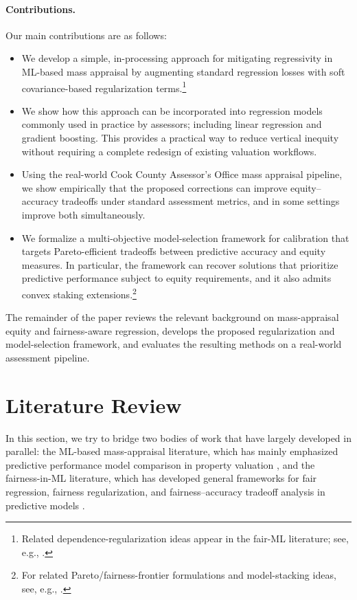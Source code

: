 \documentclass[12pt, draft]{article}
\theoremstyle{plain}
\theoremstyle{definition}
\newcommand{\1}{\mathbf{1}}
\begin{document}
\paragraph{Contributions.} Our main contributions are as follows:
\begin{itemize}
    \item We develop a simple, in-processing approach for mitigating regressivity in ML-based mass appraisal by augmenting standard regression losses with soft covariance-based regularization terms.\footnote{Related dependence-regularization ideas appear in the fair-ML literature; see, e.g., \cite{lee2022maximal,LiEtAl2022Fairness,ScutariPaneroProissl2022}.}

    \item We show how this approach can be incorporated into regression models commonly used in practice by assessors; including linear regression and gradient boosting. This provides a practical way to reduce vertical inequity without requiring a complete redesign of existing valuation workflows.

    \item Using the real-world Cook County Assessor's Office mass appraisal pipeline, we show empirically that the proposed corrections can improve equity--accuracy tradeoffs under standard assessment metrics, and in some settings improve both simultaneously.

    \item We formalize a multi-objective model-selection framework for calibration that targets Pareto-efficient tradeoffs between predictive accuracy and equity measures. In particular, the framework can recover solutions that prioritize predictive performance subject to equity requirements, and it also admits convex staking extensions.\footnote{For related Pareto/fairness-frontier formulations and model-stacking ideas, see, e.g., \cite{martinez2020minimax,little2022fairness}.}
\end{itemize}

The remainder of the paper reviews the relevant background on mass-appraisal equity and fairness-aware regression, develops the proposed regularization and model-selection framework, and evaluates the resulting methods on a real-world assessment pipeline. 

\section{Literature Review}

In this section, we try to bridge two bodies of work that have largely developed in parallel: the ML-based mass-appraisal literature, which has mainly emphasized predictive performance model comparison in property valuation \cite{Rootetal2023,Zilli2024}, and the fairness-in-ML literature, which has developed general frameworks for fair regression, fairness regularization, and fairness--accuracy tradeoff analysis in predictive models \cite{CatonHaas2024,AgarwalDudikWu2019,FitzsimonsEtAl2019,lee2022maximal,LiEtAl2022Fairness}. 
\end{document}
